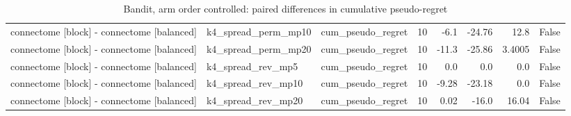 \begin{table}[t]
\begin{tabular}{lllrrrrr}
connectome [block] - connectome [balanced] & k4\_spread\_perm\_mp10 & cum\_pseudo\_regret & 10 & -6.1 & -24.76 & 12.8 & False \\
connectome [block] - connectome [balanced] & k4\_spread\_perm\_mp20 & cum\_pseudo\_regret & 10 & -11.3 & -25.86 & 3.4005 & False \\
connectome [block] - connectome [balanced] & k4\_spread\_rev\_mp5 & cum\_pseudo\_regret & 10 & 0.0 & 0.0 & 0.0 & False \\
connectome [block] - connectome [balanced] & k4\_spread\_rev\_mp10 & cum\_pseudo\_regret & 10 & -9.28 & -23.18 & 0.0 & False \\
connectome [block] - connectome [balanced] & k4\_spread\_rev\_mp20 & cum\_pseudo\_regret & 10 & 0.02 & -16.0 & 16.04 & False \\
\bottomrule
\end{tabular}
\caption{Bandit, arm order controlled: paired differences in cumulative pseudo-regret}
\label{tab:bandit_perm_paired}
\end{table}